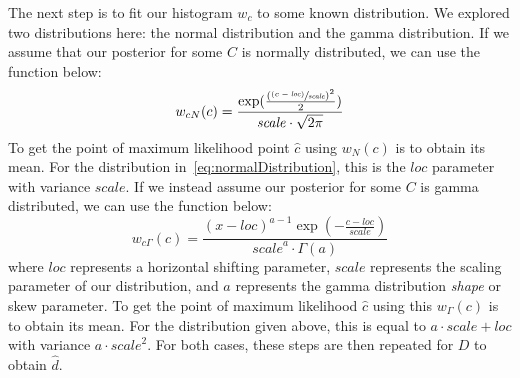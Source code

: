 The next step is to fit our histogram $w_c$ to some known distribution.
We explored two distributions here: the normal distribution and the gamma distribution.
If we assume that our posterior for some $C$ is normally distributed, we can use the function below:
\begin{equation}\label{eq:normalDistribution}
    w_{cN}(c) = \frac{\exp(\frac{\left( \sfrac{(c - \mathit{loc})}{\mathit{scale}} \right)^2}{2} )}
    {\mathit{scale} \cdot \sqrt{2\pi}}
\end{equation}
To get the point of maximum likelihood point $\hat{c}$ using $w_{N}(c)$ is to obtain its mean.
For the distribution in~\autoref{eq:normalDistribution}, this is the $\mathit{loc}$ parameter with variance
$\mathit{scale}$.
If we instead assume our posterior for some $C$ is gamma distributed, we can use the function below:
\begin{equation}
    w_{c\Gamma}(c) = \frac{(x-\mathit{loc})^{a-1}\exp(-\frac{c-\mathit{loc}}{\mathit{scale}})}{\mathit{scale}^a
    \cdot \Gamma(a)}
\end{equation}
where $\mathit{loc}$ represents a horizontal shifting parameter, $\mathit{scale}$ represents the scaling parameter of
our distribution, and $a$ represents the gamma distribution \emph{shape} or skew parameter.
To get the point of maximum likelihood $\hat{c}$ using this $w_\Gamma(c)$ is to obtain its mean.
For the distribution given above, this is equal to $a \cdot \mathit{scale} + \mathit{loc}$ with variance
$a \cdot \mathit{scale}^2$.
For both cases, these steps are then repeated for $D$ to obtain $\hat{d}$.
